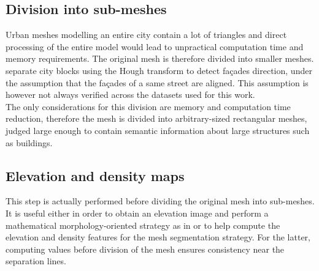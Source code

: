 \documentclass{kththesis}
\begin{document}
\subsection{Division into sub-meshes}
Urban meshes modelling an entire city contain a lot of triangles and direct processing of the entire model would lead to unpractical computation time and memory requirements. The original mesh is therefore divided into smaller meshes.  \textcite{HernandezArtefacts} separate city blocks using the Hough transform to detect façades direction, under the assumption that the façades of a same street are aligned. This assumption is however not always verified across the datasets used for this work. \\
The only considerations for this division are memory and computation time reduction, therefore the mesh is divided into arbitrary-sized rectangular meshes, judged large enough to contain semantic information about large structures such as buildings. 
\subsection{Elevation and density maps}
This step is actually performed before dividing the original mesh into sub-meshes. It is useful either in order to obtain an elevation image and perform a mathematical morphology-oriented strategy as in \parencite{det_seg_class, HernandezArtefacts} or to help compute the elevation and density features for the mesh segmentation strategy. For the latter, computing values before division of the mesh ensures consistency near the separation lines.  
\end{document}
